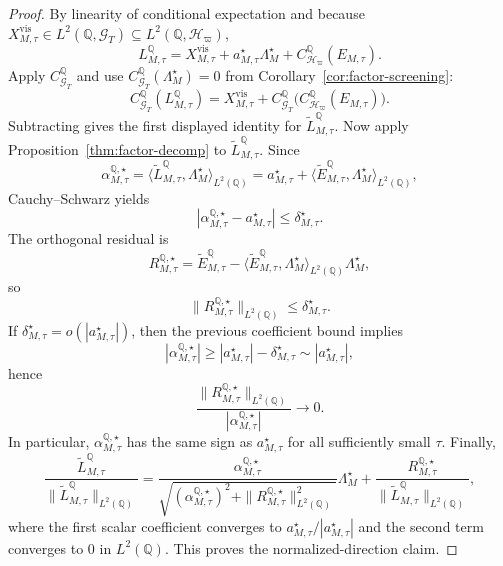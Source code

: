 \documentclass[11pt,a4paper]{amsart}
\theoremstyle{plain}
\theoremstyle{definition}
\theoremstyle{remark}
\newcommand{\QQ}{\mathbb{Q}}
\newcommand{\cG}{\mathcal{G}}
\newcommand{\cH}{\mathcal{H}}
\begin{document}
\begin{proof}
By linearity of conditional expectation and because
\(X_{M,\tau}^{\mathrm{vis}}\in L^2(\QQ,\cG_T)\subseteq L^2(\QQ,\cH_\varpi)\),
\[
        L_{M,\tau}^\QQ
        =
        X_{M,\tau}^{\mathrm{vis}}
        +
        a_{M,\tau}^\star\Lambda_M^\star
        +
        C_{\cH_\varpi}^\QQ(E_{M,\tau}).
\]
Apply \(C_{\cG_T}^\QQ\) and use \(C_{\cG_T}^\QQ(\Lambda_M^\star)=0\) from
Corollary~\ref{cor:factor-screening}:
\[
        C_{\cG_T}^\QQ(L_{M,\tau}^\QQ)
        =
        X_{M,\tau}^{\mathrm{vis}}
        +
        C_{\cG_T}^\QQ\bigl(C_{\cH_\varpi}^\QQ(E_{M,\tau})\bigr).
\]
Subtracting gives the first displayed identity for \(\widetilde L_{M,\tau}^\QQ\).  Now apply
Proposition~\ref{thm:factor-decomp} to \(\widetilde L_{M,\tau}^\QQ\).  Since
\[
        \alpha_{M,\tau}^{\QQ,\star}
        =
        \langle \widetilde L_{M,\tau}^\QQ,\Lambda_M^\star\rangle_{L^2(\QQ)}
        =
        a_{M,\tau}^\star
        +
        \langle \widetilde E_{M,\tau}^\QQ,\Lambda_M^\star\rangle_{L^2(\QQ)},
\]
Cauchy--Schwarz yields
\[
        |\alpha_{M,\tau}^{\QQ,\star}-a_{M,\tau}^\star|
        \le
        \delta_{M,\tau}^\star.
\]
The orthogonal residual is
\[
        R_{M,\tau}^{\QQ,\star}
        =
        \widetilde E_{M,\tau}^\QQ
        -
        \langle \widetilde E_{M,\tau}^\QQ,\Lambda_M^\star\rangle_{L^2(\QQ)}\Lambda_M^\star,
\]
so
\[
        \|R_{M,\tau}^{\QQ,\star}\|_{L^2(\QQ)}
        \le
        \delta_{M,\tau}^\star.
\]
If \(\delta_{M,\tau}^\star=o(|a_{M,\tau}^\star|)\), then the previous coefficient bound implies
\[
        |\alpha_{M,\tau}^{\QQ,\star}|
        \ge
        |a_{M,\tau}^\star|-\delta_{M,\tau}^\star
        \sim
        |a_{M,\tau}^\star|,
\]
hence
\[
        \frac{\|R_{M,\tau}^{\QQ,\star}\|_{L^2(\QQ)}}{|\alpha_{M,\tau}^{\QQ,\star}|}
        \to 0.
\]
In particular, \(\alpha_{M,\tau}^{\QQ,\star}\) has the same sign as \(a_{M,\tau}^\star\) for all
sufficiently small \(\tau\).  Finally,
\[
        \frac{\widetilde L_{M,\tau}^\QQ}{\|\widetilde L_{M,\tau}^\QQ\|_{L^2(\QQ)}}
        =
        \frac{\alpha_{M,\tau}^{\QQ,\star}}{\sqrt{(\alpha_{M,\tau}^{\QQ,\star})^2+\|R_{M,\tau}^{\QQ,\star}\|_{L^2(\QQ)}^2}}
        \Lambda_M^\star
        +
        \frac{R_{M,\tau}^{\QQ,\star}}{\|\widetilde L_{M,\tau}^\QQ\|_{L^2(\QQ)}},
\]
where the first scalar coefficient converges to
\(
        a_{M,\tau}^\star/|a_{M,\tau}^\star|
\)
and the second term converges to \(0\) in \(L^2(\QQ)\).  This proves the normalized-direction
claim.
\end{proof}
\end{document}
